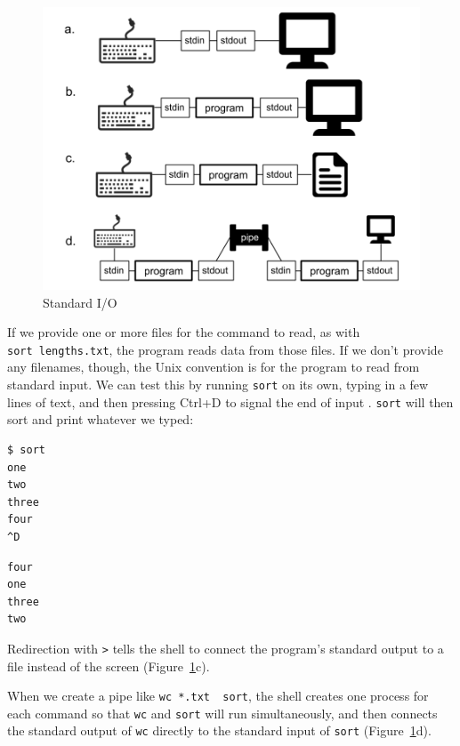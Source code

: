 \documentclass[
]{krantz}
\begin{document}
\begin{figure}

{\centering \includegraphics[width=1\linewidth]{figures/bash-basics/standard-io} 

}

\caption{Standard I/O}\label{fig:bash-basics-stdio}
\end{figure}

If we provide one or more files for the command to read,
as with \texttt{sort\ lengths.txt},
the program reads data from those files.
If we don't provide any filenames,
though,
the Unix convention is for the program to read from standard input.
We can test this by running \texttt{sort} on its own,
typing in a few lines of text,
and then pressing Ctrl+D to signal the end of input .
\texttt{sort} will then sort and print whatever we typed:

\begin{verbatim}
$ sort
one
two
three
four
^D
\end{verbatim}

\begin{verbatim}
four
one
three
two
\end{verbatim}

Redirection with \texttt{\textgreater{}} tells the shell to connect the program's standard output to a file
instead of the screen (Figure~\ref{fig:bash-basics-stdio}c).

When we create a pipe like \texttt{wc\ *.txt\ \textbar{}\ sort},
the shell creates one process for each command so that \texttt{wc} and \texttt{sort} will run simultaneously,
and then connects the standard output of \texttt{wc} directly to the standard input of \texttt{sort}
(Figure~\ref{fig:bash-basics-stdio}d).
\end{document}
